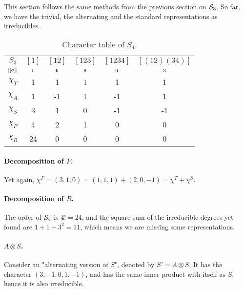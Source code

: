 \begin{example}
	This section follows the same methods from the previous section on $\mathcal{S}_3$. So far, we have the trivial, the alternating and the standard representations as irreducibles. 
	
		\begin{table}[hbt!]
		\centering
		\begin{tabular}{c | c c c c c}
			$S_3$      & $[1]$   & $[12]$  & $[123]$ & $[1234]$ & $[(12)(34)]$ \\
			$\scriptstyle|[\sigma]|$ & $\scriptstyle 1$ & $\scriptstyle 6$ & $\scriptstyle 8$ & $\scriptstyle 6$  & $\scriptstyle 3$      \\ \hline
			$\chi_T$     & 1       & 1       & 1       & 1        & 1            \\
			$\chi_A$     & 1       & -1      & 1       & -1       & 1            \\
			$\chi_S$     & 3       & 1       & 0       & -1       & -1           \\ \hline\hline
			$\chi_P$     & 4       & 2       & 1       & 0        & 0            \\
			$\chi_R$     & 24      & 0       & 0       & 0        & 0            	\end{tabular}
		\caption{Character table of $S_4$.}
		\label{table:charS4}
	\end{table}
	
	\paragraph{Decomposition of $P$.} Yet again, $\chi^P = (3,1,0) = (1,1,1) + (2,0,-1) = \chi^T + \chi^S$.
	
	\paragraph{Decomposition of $R$.}  The order of $\mathcal{S}_4$ is $4! = 24$, and the square sum of the irreducible degrees yet found are $1 + 1 + 3^2 = 11$, which means we are missing some representations.
	
	\paragraph{$A \otimes S$.} Consider an "alternating version of $S$", denoted by $S' = A \otimes S$. It has the character $(3,-1,0,1,-1)$, and has the same inner product with itself as $S$, hence it is also irreducible. 
	

\end{example}
